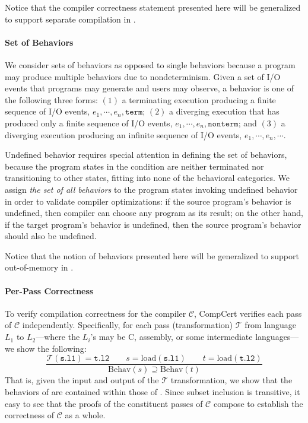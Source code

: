 Notice that the compiler correctness statement presented here will be generalized to support
separate compilation in .


\paragraph{Set of Behaviors}

We consider sets of behaviors as opposed to single behaviors because a program may produce multiple
behaviors due to nondeterminism.  Given a set of I/O events that programs may generate and users may
observe, a behavior is one of the following three forms: $(1)$ a terminating execution producing a
finite sequence of I/O events, $e_1, \cdots, e_n, \mathtt{term}$; $(2)$ a diverging execution that
has produced only a finite sequence of I/O events, $e_1, \cdots, e_n, \mathtt{nonterm}$; and $(3)$ a
diverging execution producing an infinite sequence of I/O events, $e_1, \cdots, e_n, \cdots$.

Undefined behavior requires special attention in defining the set of behaviors, because the program
states in the condition are neither terminated nor transitioning to other states, fitting into none
of the behavioral categories.  We assign \emph{the set of all behaviors} to the program states
invoking undefined behavior in order to validate compiler optimizations: if the source program's
behavior is undefined, then compiler can choose any program as its result; on the other hand, if the
target program's behavior is undefined, then the source program's behavior should also be undefined.

Notice that the notion of behaviors presented here will be generalized to support out-of-memory in
.


\paragraph{Per-Pass Correctness}

To verify compilation correctness for the compiler $\mathcal{C}$, CompCert verifies each pass of
$\mathcal{C}$ independently.  Specifically, for each pass (transformation) $\mathcal{T}$ from
language $L_1$ to $L_2$---where the $L_i$'s may be C, assembly, or some intermediate languages---we
show the following:
\[
\frac{
\mathcal{T}(\mathtt{s.l1}) = \mathtt{t.l2} \qquad
s = \mathrm{load}(\mathtt{s.l1}) \qquad
t = \mathrm{load}(\mathtt{t.l2})
}
{
\mathrm{Behav}(s) \supseteq \mathrm{Behav}(t)
}
\]
That is, given the input  and output  of the $\mathcal{T}$ transformation, we
show that the behaviors of  are contained within those of .  Since subset
inclusion is transitive, it easy to see that the proofs of the constituent passes of $\mathcal{C}$
compose to establish the correctness of $\mathcal{C}$ as a whole.

